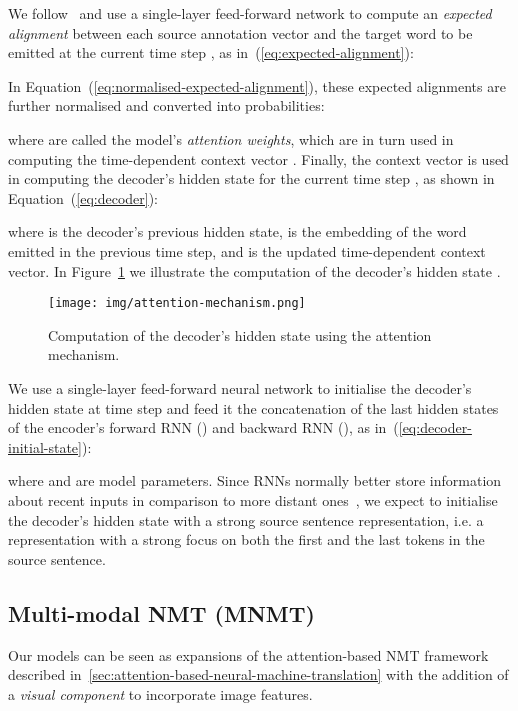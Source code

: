 \documentclass[11pt,twocolumn]{article}
\begin{document}
We follow~
and use a single-layer feed-forward network
to compute an \emph{expected alignment} 
between each source annotation vector 
and the target word to be emitted at the current time step , as in~(\ref{eq:expected-alignment}):


In Equation~(\ref{eq:normalised-expected-alignment}),
these expected alignments are further normalised and converted into
probabilities:


\noindent
where  are called the model's \emph{attention weights},
which are in turn used in computing the time-dependent context vector
.
Finally, the context vector  is used in computing the decoder's hidden state  for the current time step , as shown in Equation~(\ref{eq:decoder}):


\noindent
where  is the decoder's previous hidden state,
 is the embedding of the word emitted in the previous time step,
and  is the updated time-dependent context vector.
In Figure~\ref{fig:attention-mechanism}
we illustrate the computation of
the decoder's hidden state .


\begin{figure}[t!]
 \centering
 \texttt{[image: img/attention-mechanism.png]}
 \caption{Computation of the decoder's hidden state 
using the attention mechanism.}
\label{fig:attention-mechanism}
\end{figure}

We use a single-layer feed-forward neural network to initialise the decoder's hidden state  at time step  and feed it the concatenation of the last hidden states of the encoder's forward RNN  () and backward RNN (), as in~(\ref{eq:decoder-initial-state}):

\noindent
where  and  are model parameters.
Since RNNs normally better store information about recent inputs in comparison to more distant ones~\cite{HochreiterSchmidhuber1997,BahdanauChoBengio2015}, we expect to initialise the decoder's hidden state with a strong source sentence representation, i.e. a representation with a strong focus on both the first and the last tokens in the source sentence.



\subsection{Multi-modal NMT (MNMT)}
\label{sec:multimodal-neural-machine-translation}

Our models can be seen as
expansions of the attention-based NMT framework described in~\cref{sec:attention-based-neural-machine-translation} with
the addition of a \emph{visual component} to incorporate image features.
\end{document}
